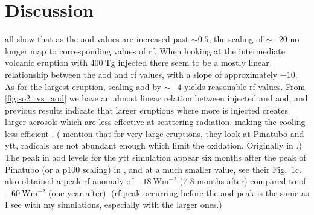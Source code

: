 \documentclass{ametsocV5}
\newcommand{\iso}[1][i]{{#1}njected \ce{SO2}}
\begin{document}
\section{Discussion}%
\label{sec:discussion}


all show that as the \ac{aod} values are increased past \(\sim 0.5\), the scaling of
\(\sim -20\) no longer map to corresponding values of \ac{rf}. When looking at the
intermediate volcanic eruption with \(\SI{400}{\tera\gram}\) \iso{} there seem to be a
mostly linear relationship between the \ac{aod} and \ac{rf} values, with a slope of
approximately \(-10\). As for the largest eruption, scaling \ac{aod} by \(\sim-4\)
yields reasonable \ac{rf} values. From \cref{fig:so2_vs_aod} we have an almost linear
relation between \iso{} and \ac{aod}, and previous results indicate that larger
eruptions where more  is injected creates larger aerosols which are less
effective at scattering radiation, making the cooling less efficient
\citep{english2013,timmreck2010,timmreck2018}. (\citet{timmreck2010} mention that for
very large eruptions, they look at Pinatubo and \ac{ytt},  radicals are not
abundant enough which limit the  oxidation. Originally in \citep{bekki1995}.)
The peak in \ac{aod} levels for the \ac{ytt} simulation appear six months after the peak
of Pinatubo (or a \ac{p100} scaling) in \citet{timmreck2010}, and at a much smaller
value, see their Fig.\ 1c. \citet{timmreck2010} also obtained a peak \ac{rf} anomaly of
\(\SI{-18}{\watt\metre^{-2}}\) (\(7\)-\(8\) months after) compared to \citet{jones2005}
of \(\SI{-60}{\watt\metre^{-2}}\) (one year after). (\ac{rf} peak occurring before the
\ac{aod} peak is the same as I see with my simulations, especially with the larger
ones.)
\end{document}
